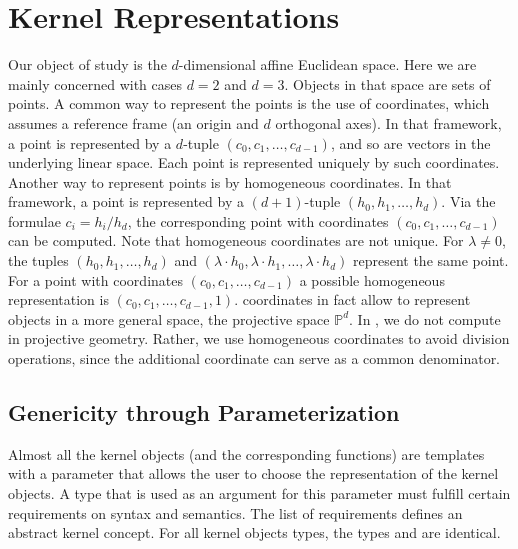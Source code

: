 \section{Kernel Representations}
Our object of study is the $d$-dimensional affine Euclidean space. 
Here we are mainly concerned with cases $d=2$ and $d=3$.
Objects in that space are sets of points. A common way to represent 
the points is the use of  coordinates,
which assumes a reference frame (an origin and $d$ orthogonal axes).
In that framework, a point is represented by a $d$-tuple
$(c_0,c_1,\ldots,c_{d-1})$,
and so are vectors in the underlying linear space. Each point is 
represented uniquely by such  coordinates.
Another way to represent points is by homogeneous coordinates. In that
framework, a point is represented by a $(d+1)$-tuple
$(h_0,h_1,\ldots,h_d)$.
Via the formulae $c_i = h_i/h_d$,
the corresponding point with  coordinates
$(c_0,c_1,\ldots,c_{d-1})$
can be computed.  Note that homogeneous coordinates are not unique. 
For $\lambda\ne 0$, the tuples $(h_0,h_1,\ldots,h_d)$ and 
$(\lambda\cdot h_0,\lambda\cdot h_1,\ldots,\lambda\cdot h_d)$
represent the same point.
For a point with  coordinates $(c_0,c_1,\ldots,c_{d-1})$ a
possible homogeneous representation is $(c_0,c_1,\ldots,c_{d-1},1)$.
 coordinates in fact allow to represent 
objects in a more general space, the projective space
$\mathbb{P}^d$.
In \cgal, we do not compute in projective geometry. Rather, we use 
homogeneous coordinates to avoid division operations,
since the additional coordinate can serve as a common denominator.

\subsection{Genericity through Parameterization}

Almost all the kernel objects (and the corresponding functions) are
templates with a parameter that allows the user to choose the
representation of the kernel objects. A type that is used as an
argument for this parameter must fulfill certain requirements on
syntax and semantics. The list of requirements defines an abstract
kernel concept. For all kernel objects types, the types
 and 
 are identical.

